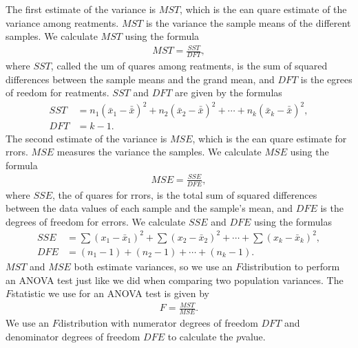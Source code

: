\documentclass[letterpaper,10pt,english]{jupyterBook}
\begin{document}
\sphinxAtStartPar
The first estimate of the variance is \(MST\), which is the ean quare estimate of the variance among reatments. \(MST\) is the variance  the sample means of the different samples. We calculate \(MST\) using the formula
\begin{equation*}
\begin{split} MST = \frac{SST}{DFT}, \end{split}
\end{equation*}
\sphinxAtStartPar
where \(SST\), called the um of quares among reatments, is the sum of squared differences between the sample means and the grand mean, and \(DFT\) is the egrees of reedom for reatments. \(SST\) and \(DFT\) are given by the formulas
\begin{align*}
SST &= n_1(\bar{x}_1 - \bar{\bar{x}})^2 + n_2(\bar{x}_2 - \bar{\bar{x}})^2 + \cdots + n_k(\bar{x}_k - \bar{\bar{x}})^2, \\
DFT &= k - 1.
\end{align*}
\sphinxAtStartPar
The second estimate of the variance is \(MSE\), which is the ean quare estimate for rrors. \(MSE\) measures the variance  the samples. We calculate \(MSE\) using the formula
\begin{equation*}
\begin{split} MSE = \frac{SSE}{DFE}, \end{split}
\end{equation*}
\sphinxAtStartPar
where \(SSE\), the  of quares for rrors, is the total sum of squared differences between the data values of each sample and the sample’s mean, and \(DFE\) is the degrees of freedom for errors. We calculate \(SSE\) and \(DFE\) using the formulas
\begin{align*}
SSE &= \sum (x_1 - \bar{x}_1)^2 + \sum (x_2 - \bar{x}_2)^2 + \cdots + \sum (x_k - \bar{x}_k)^2, \\
DFE &= (n_1 - 1) + (n_2 - 1) + \cdots + (n_k - 1).
\end{align*}
\sphinxAtStartPar
\(MST\) and \(MSE\) both estimate variances, so we use an \(F\)\sphinxhyphen{}distribution to perform an ANOVA test just like we did when comparing two population variances. The \(F\)\sphinxhyphen{}statistic we use for an ANOVA test is given by
\begin{equation*}
\begin{split} F = \frac{MST}{MSE}. \end{split}
\end{equation*}
\sphinxAtStartPar
We use an \(F\)\sphinxhyphen{}distribution with numerator degrees of freedom \(DFT\) and denominator degrees of freedom \(DFE\) to calculate the \(p\)\sphinxhyphen{}value.
\end{document}
